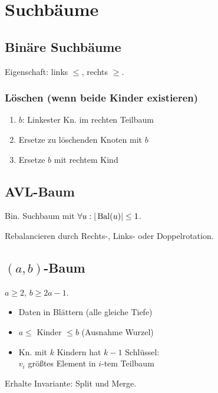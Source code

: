 \section*{Suchbäume}

\subsection*{Binäre Suchbäume}
Eigenschaft: links $\le$, rechts $\ge$.

\subsubsection*{Löschen (wenn beide Kinder existieren)}
\begin{enumerate}
	\item $b$: Linkester Kn. im rechten Teilbaum
	\item Ersetze zu löschenden Knoten mit $b$
	\item Ersetze $b$ mit rechtem Kind
\end{enumerate}

\subsection*{AVL-Baum}
Bin. Suchbaum mit $\forall u: |\operatorname{Bal}(u)| \le 1$.

Rebalancieren durch Rechts-, Links- oder Doppelrotation.

\subsection*{$(a,b)$-Baum}
$a \ge 2$, $b \ge 2a - 1$.
\begin{itemize}
	\item Daten in Blättern (alle gleiche Tiefe)
	\item $a \le$ Kinder $\le b$ (Ausnahme Wurzel)
	\item Kn. mit $k$ Kindern hat $k-1$ Schlüssel:\\
		$v_i$ größtes Element in $i$-tem Teilbaum
\end{itemize}

Erhalte Invariante: Split und Merge.

